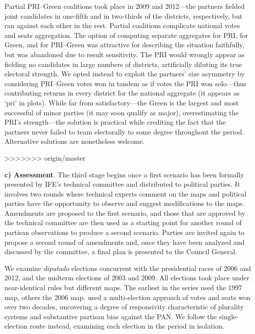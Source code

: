 \documentclass[letter,12pt]{article}
\begin{document}
Partial PRI--Green coalitions took place in 2009 and 2012---the partners fielded joint candidates in one-fifth and in two-thirds of the districts, respectively, but ran against each other in the rest. Partial coalitions complicate national votes and seats aggregation. The option of computing separate aggregates for PRI, for Green, and for PRI--Green was attractive for describing the situation faithfully, but was abandoned due to result sensitivity. The PRI would wrongly appear as fielding no candidates in large numbers of districts, artificially diluting its true electoral strength. We opted instead to exploit the partners' size asymmetry by considering PRI--Green votes won in tandem as if votes the PRI won solo---thus contributing returns in every district for the national aggregate (it appears as `pri' in plots). While far from satisfactory---the Green is the largest and most successful of minor parties (it may soon qualify as major), overestimating the PRI's strength---the solution is practical while crediting the fact that the partners never failed to team electorally to some degree throughout the period. Alternative solutions are nonetheless welcome. 

>>>>>>> origin/master

\textbf{c) Assessment}. The third stage begins once a first scenario has been formally presented by IFE's technical committee and distributed to political parties. It involves two rounds where technical experts comment on the maps and political parties have the opportunity to observe and suggest modifications to the maps. Amendments are proposed to the first scenario, and those that are approved by the technical committee are then used as a starting point for another round of partisan observations to produce a second scenario. Parties are invited again to propose a second round of amendments and, once they have been analyzed and discussed by the committee, a final plan is presented to the Council General. 

We examine \emph{diputado} elections concurrent with the presidential races of 2006 and 2012, and the midterm elections of 2003 and 2009. All elections took place under near-identical rules but different maps. The earliest in the series used the 1997 map, others the 2006 map. \citet{marquez2014biasBlog} used a multi-election approach of votes and seats won over two decades, uncovering a degree of responsivity characteristic of plurality systems and substantive partisan bias against the PAN. We follow the single-election route instead, examining each election in the period in isolation.  
\end{document}
